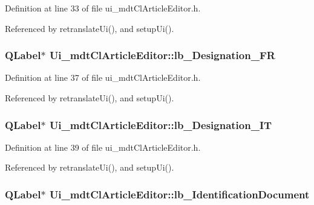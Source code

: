 Definition at line 33 of file ui\-\_\-mdt\-Cl\-Article\-Editor.\-h.



Referenced by retranslate\-Ui(), and setup\-Ui().

\hypertarget{class_ui__mdt_cl_article_editor_a67b7ae250e0391f57e8903e403e03348}{
\subsubsection[{lb\-\_\-\-Designation\-\_\-\-F\-R}]{\setlength{\rightskip}{0pt plus 5cm}Q\-Label$\ast$ Ui\-\_\-mdt\-Cl\-Article\-Editor\-::lb\-\_\-\-Designation\-\_\-\-F\-R}}\label{class_ui__mdt_cl_article_editor_a67b7ae250e0391f57e8903e403e03348}


Definition at line 37 of file ui\-\_\-mdt\-Cl\-Article\-Editor.\-h.



Referenced by retranslate\-Ui(), and setup\-Ui().

\hypertarget{class_ui__mdt_cl_article_editor_a2da779d6e0a55029dd48cdc2a1007cff}{
\subsubsection[{lb\-\_\-\-Designation\-\_\-\-I\-T}]{\setlength{\rightskip}{0pt plus 5cm}Q\-Label$\ast$ Ui\-\_\-mdt\-Cl\-Article\-Editor\-::lb\-\_\-\-Designation\-\_\-\-I\-T}}\label{class_ui__mdt_cl_article_editor_a2da779d6e0a55029dd48cdc2a1007cff}


Definition at line 39 of file ui\-\_\-mdt\-Cl\-Article\-Editor.\-h.



Referenced by retranslate\-Ui(), and setup\-Ui().

\hypertarget{class_ui__mdt_cl_article_editor_a994df9029ebf28e0df212fb399da9e5a}{
\subsubsection[{lb\-\_\-\-Identification\-Document}]{\setlength{\rightskip}{0pt plus 5cm}Q\-Label$\ast$ Ui\-\_\-mdt\-Cl\-Article\-Editor\-::lb\-\_\-\-Identification\-Document}}\label{class_ui__mdt_cl_article_editor_a994df9029ebf28e0df212fb399da9e5a}


